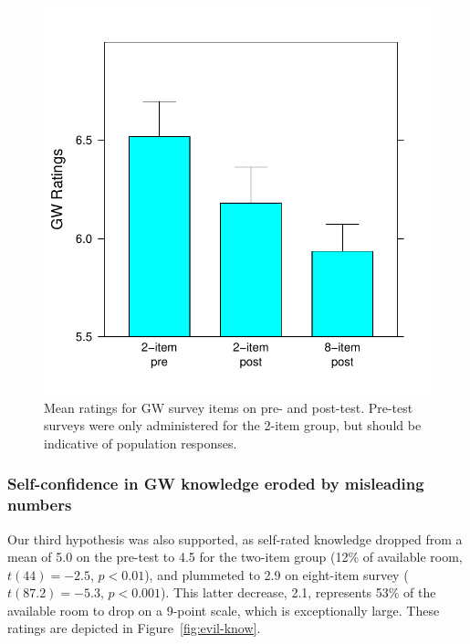 \begin{figure}
    \centering
    \includegraphics{evil-GW.pdf}
    \caption{Mean ratings for GW survey items on pre- and post-test. Pre-test
        surveys were only administered for the 2-item group, but should be
        indicative of population responses.}
    \label{fig:evil-GW}
\end{figure}

\subsubsection{Self-confidence in GW knowledge eroded by misleading numbers}

Our third hypothesis was also supported, as self-rated knowledge dropped from a
mean of 5.0 on the pre-test to 4.5 for the two-item group (12\% of available
room, $t(44)=-2.5$, $p<0.01$), and plummeted to 2.9 on eight-item survey
($t(87.2)=-5.3$, $p<0.001$). This latter decrease, 2.1, represents 53\% of the
available room to drop on a 9-point scale, which is exceptionally large. These
ratings are depicted in Figure~\ref{fig:evil-know}.

